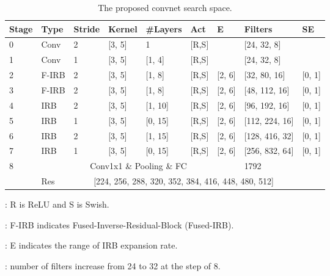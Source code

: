\documentclass[10pt,twocolumn,letterpaper]{article}
\begin{document}
\begin{table}[!tb]
\begin{threeparttable}
\footnotesize
\setlength{\tabcolsep}{0.2em}
  \centering
    \begin{tabular}{ l l l l l l l l l}
          \toprule
          {Stage} & {Type} & Stride & Kernel & \#Layers        & Act   & E & Filters & SE   \\
    	  \midrule 
    	  0       & Conv       & 2      & [3, 5] & 1         & [R,S] &       & [24, 32,  8] &        \\
		  1       & Conv       & 1      & [3, 5] & [1, 4]    & [R,S]           &       & [24, 32,  8]     &        \\
		  \midrule
		  2       & F-IRB  & 2      & [3, 5] & [1, 8]    & [R,S] & [2, 6] & [32, 80,  16]    & [0, 1] \\
		  3       & F-IRB             & 2      & [3, 5] & [1, 8]    & [R,S] & [2, 6] & [48, 112, 16]    & [0, 1] \\
		  \midrule
		  4       & IRB        & 2      & [3, 5] & [1, 10]   & [R,S] & [2, 6] & [96, 192, 16]    & [0, 1] \\
		  5       & IRB        & 1      & [3, 5] & [0, 15]   & [R,S] & [2, 6] & [112, 224, 16]   & [0, 1] \\
		  6       & IRB        & 2      & [3, 5] & [1, 15]   & [R,S] & [2, 6] & [128, 416, 32]   & [0, 1] \\
		  7       & IRB        & 1      & [3, 5] & [0, 15]   & [R,S] & [2, 6] & [256, 832, 64]   & [0, 1] \\
		  \midrule
		  8       & \multicolumn{6}{c}{Conv1x1 \& Pooling \& FC} & 1792 \\
	      \midrule
	      & Res & \multicolumn{6}{c}{[224, 256, 288, 320, 352, 384, 416, 448, 480, 512]} \\
	      \bottomrule
    \end{tabular}
    \begin{tablenotes}
      \item : R is ReLU and S is Swish.
      \item : F-IRB indicates Fused-Inverse-Residual-Block (Fused-IRB).
      \item : E indicates the range of IRB expansion rate.
      \item : number of filters increase from 24 to 32 at the step of 8. 
    \end{tablenotes}
  \end{threeparttable}
  \caption{The proposed convnet search space.}
  \label{table:search_space}
  \vspace{-.3cm}
 \end{table}
\end{document}
